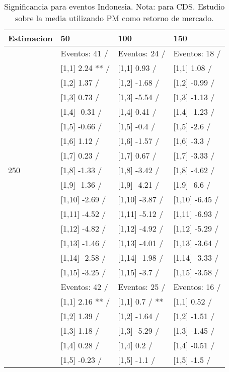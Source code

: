 \begin{table}

\caption{Significancia para eventos Indonesia. Nota: para CDS. Estudio sobre la media utilizando PM como retorno de mercado.}
\centering
\begin{tabular}[t]{llll}
\toprule
Estimacion & 50 & 100 & 150\\
\midrule
 & Eventos:  41 / & Eventos:  24 / & Eventos:  18 /\\
 & {}[1,1] 2.24 ** / & {}[1,1] 0.93  / & {}[1,1] 1.08  /\\
 & {}[1,2] 1.37  / & {}[1,2] -1.68  / & {}[1,2] -0.99  /\\
 & {}[1,3] 0.73  / & {}[1,3] -5.54  / & {}[1,3] -1.13  /\\
 & {}[1,4] -0.31  / & {}[1,4] 0.41  / & {}[1,4] -1.23  /\\
\addlinespace
 & {}[1,5] -0.66  / & {}[1,5] -0.4  / & {}[1,5] -2.6  /\\
 & {}[1,6] 1.12  / & {}[1,6] -1.57  / & {}[1,6] -3.3  /\\
 & {}[1,7] 0.23  / & {}[1,7] 0.67  / & {}[1,7] -3.33  /\\
250 & {}[1,8] -1.33  / & {}[1,8] -3.42  / & {}[1,8] -4.62  /\\
 & {}[1,9] -1.36  / & {}[1,9] -4.21  / & {}[1,9] -6.6  /\\
\addlinespace
 & {}[1,10] -2.69  / & {}[1,10] -3.87  / & {}[1,10] -6.45  /\\
 & {}[1,11] -4.52  / & {}[1,11] -5.12  / & {}[1,11] -6.93  /\\
 & {}[1,12] -4.82  / & {}[1,12] -4.92  / & {}[1,12] -5.29  /\\
 & {}[1,13] -1.46  / & {}[1,13] -4.01  / & {}[1,13] -3.64  /\\
 & {}[1,14] -2.58  / & {}[1,14] -1.98  / & {}[1,14] -3.33  /\\
\addlinespace
 & {}[1,15] -3.25  / & {}[1,15] -3.7  / & {}[1,15] -3.58  /\\
 & Eventos:  42 / & Eventos:  25 / & Eventos:  16 /\\
 & {}[1,1] 2.16 ** / & {}[1,1] 0.7  / ** & {}[1,1] 0.52  /\\
 & {}[1,2] 1.39  / & {}[1,2] -1.64  / & {}[1,2] -1.51  /\\
 & {}[1,3] 1.18  / & {}[1,3] -5.29  / & {}[1,3] -1.45  /\\
\addlinespace
 & {}[1,4] 0.28  / & {}[1,4] 0.2  / & {}[1,4] -0.51  /\\
 & {}[1,5] -0.23  / & {}[1,5] -1.1  / & {}[1,5] -1.5  /\\

\end{tabular}
\end{table}
